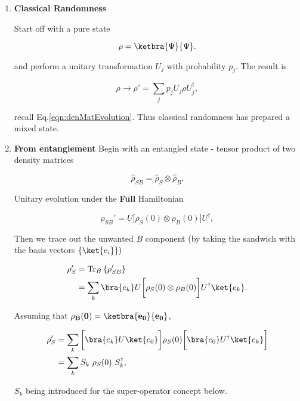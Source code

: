 \begin{enumerate}
	\item \textbf{Classical Randomness}
	
	Start off with a pure state 
	
	\begin{equation}
	\rho = \ketbra{\Psi}{\Psi}.
	\end{equation}
	
	\noindent and perform a unitary transformation $U_j$ with probability $p_j$. The result is
	
	\begin{equation}
	\rho \rightarrow \rho'=\sum_jp_jU_j\rho U_j^\dagger,
	\end{equation}
	
	\noindent recall Eq.\eqref{eqn:denMatEvolution}. Thus classical randomness has prepared a mixed state.
	\item \textbf{From entanglement}
	Begin with an entangled state - tensor product of two density matrices
	
	\begin{equation}
	\hat{\rho}_{SB} = \hat{\rho}_{S} \otimes \hat{\rho}_{B}.
	\end{equation}
	
	Unitary evolution under the \textbf{Full} Hamiltonian
	
	\begin{equation}
	\rho_{SB}' = U\bigg[\rho_S(0)\otimes\rho_B(0)\bigg]U^\dagger,
	\end{equation}
	
	\noindent Then we trace out the unwanted $B$ component (by taking the sandwich with the basis vectors $\left\lbrace \ket{e_i} \right\rbrace )$
	
	\begin{equation}
	\begin{aligned}
	\rho'_S & = \text{Tr}_B\left\lbrace\rho_{SB}'\right\rbrace\\
	& = \sum_k\bra{e_k}U\bigg[\rho_S(0)\otimes\rho_B(0)\bigg]U^\dagger\ket{e_k}.
	\end{aligned}
	\end{equation}
	
	\noindent Assuming that $\mathbf{\rho_B(0) = \ketbra{e_0}{e_0}}$,
	
	\begin{equation}
	\begin{aligned}
	\rho'_S & = \sum_k\bigg[\bra{e_k}U\ket{e_0}\bigg]\rho_S(0)\bigg[\bra{e_0} U^\dagger\ket{e_k}\bigg]\\
	& = \sum_kS_k\ \rho_S(0)\ S_k^\dagger,
	\end{aligned}
	\end{equation}
	
	\noindent $S_k$ being introduced for the super-operator concept below.
\end{enumerate}

